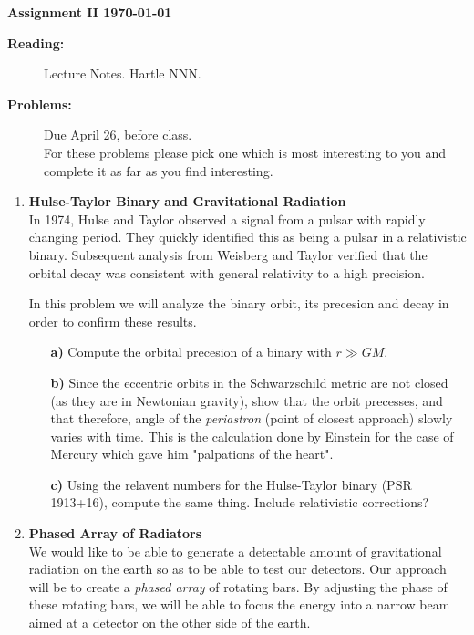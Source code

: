 \documentclass[11pt]{article}
\begin{document}
%
\centerline{\large\bf  \hfill Assignment II \hfill  \today}

\medskip
\begin{description}
\item[{\bf Reading:}] Lecture Notes. Hartle NNN. \\
\item[{\bf Problems:} \hfill ] Due April 26, before class. \\
For these problems please pick one which is most interesting to you and complete it as far as you find interesting.
\end{description}


\medskip

\begin{enumerate}

\item
{\bf Hulse-Taylor Binary and Gravitational Radiation} \\
In 1974, Hulse and Taylor observed a signal from a pulsar with rapidly changing period. They quickly identified this as being a pulsar in a relativistic binary. Subsequent analysis from Weisberg and Taylor verified that the orbital decay was consistent with general relativity to a high precision.

In this problem we will analyze the binary orbit, its precesion and decay in order to confirm these results.
\begin{itemize}

\item[\bf a)] Compute the orbital precesion of a binary with $r \gg G M$.

\item[\bf b)] Since the eccentric orbits in the Schwarzschild metric are not closed (as they are in Newtonian gravity), show that the orbit precesses, and that therefore, angle of the \emph{periastron} (point of closest approach) slowly varies with time. This is the calculation done by Einstein for the case of Mercury which gave him "palpations of the heart".

\item[\bf c)] Using the relavent numbers for the Hulse-Taylor binary (PSR 1913+16), compute the same thing. Include relativistic corrections?

\end{itemize}

\clearpage
\item
{\bf Phased Array of Radiators} \\
We would like to be able to generate a detectable amount of gravitational radiation on the earth so as to be able to test our detectors. Our approach will be to create a \emph{phased array} of rotating bars. By adjusting the phase of these rotating bars, we will be able to focus the energy into a narrow beam aimed at a detector on the other side of the earth.
\begin{itemize}


\end{itemize}
\end{enumerate}
\end{document}
